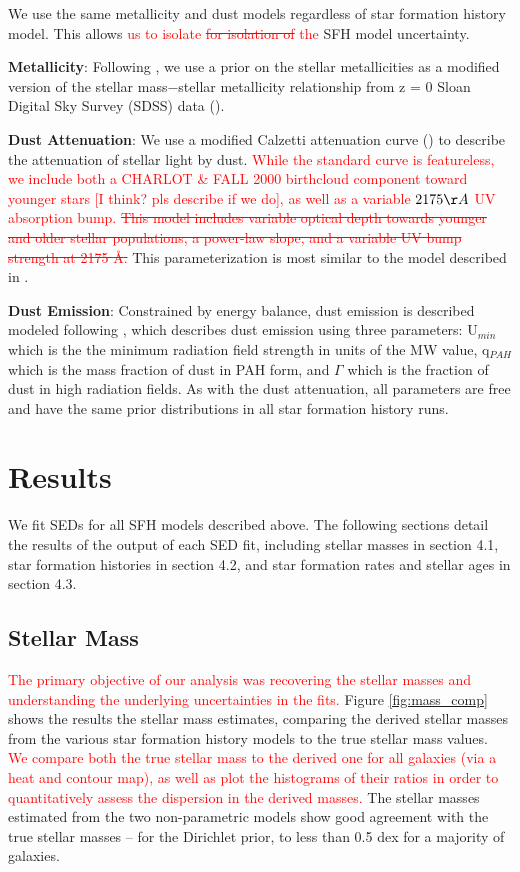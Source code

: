 \documentclass[twocolumn]{aastex62}
\newcommand{\red}[1]{{\textcolor{red}{#1}}}
\begin{document}
We use the same metallicity and dust models regardless of star formation history model. This allows \red{us to isolate \sout{for isolation of} the} SFH model uncertainty. 

\textbf{Metallicity}: Following \cite{leja_older_2019}, we use a prior on the stellar metallicities as a modified version of the stellar mass$-$stellar metallicity relationship from z = 0 Sloan Digital Sky Survey (SDSS) data (\cite{gallazzi_ages_2005}). 

\textbf{Dust Attenuation}: We use a modified Calzetti attenuation curve (\cite{calzetti_dust_2001}) to describe the attenuation of stellar light by dust.  \red{While the standard \citet{calzetti_dust_2001} curve is featureless, we include both a CHARLOT \& FALL 2000 birthcloud component toward younger stars [I think? pls describe if we do], as well as a variable $2175 \AA$ UV absorption bump. \sout{ This model includes variable optical depth towards younger and older stellar populations, a power-law slope, and a variable UV bump strength at 2175 {\AA}. }}This parameterization is most similar to the model described in \cite{noll_analysis_2009}.   

\textbf{Dust Emission}: Constrained by energy balance, dust emission is described modeled following \cite{draine_infrared_2007}, which describes dust emission using three parameters: U$_{min}$ which is the the minimum radiation field strength in units of the MW value, q$_{PAH}$ which is the mass fraction of dust in PAH form, and $\Gamma$ which is the fraction of dust in high radiation fields. As with the dust attenuation, all parameters are free and have the same prior distributions in all star formation history runs. 



\section{Results} 

We fit SEDs for all SFH models described above. The following sections detail the results of the output of each SED fit, including stellar masses in section 4.1, star formation histories in section 4.2, and star formation rates and stellar ages in section 4.3. 

\subsection{Stellar Mass}

\red{The primary objective of our analysis was recovering the stellar masses and understanding the underlying uncertainties in the fits.}  Figure \ref{fig:mass_comp} shows the results the stellar mass estimates, comparing the derived stellar masses from the various star formation history models to the true stellar mass values. \red{We compare both the true stellar mass to the derived one for all galaxies (via a heat and contour map), as well as plot the histograms of their ratios in order to quantitatively assess the dispersion in the derived masses.} The stellar masses estimated from the two non-parametric models show good agreement with the true stellar masses -- for the Dirichlet prior, to less than 0.5 dex for a majority of galaxies. 
\end{document}
